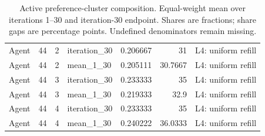 \begin{table}[htbp!]
\begin{tabular}{lrrlrrl}
Agent & 44 & 2 & iteration\_30 & 0.206667 & 31 & L4: uniform refill \\
Agent & 44 & 2 & mean\_1\_30 & 0.205111 & 30.7667 & L4: uniform refill \\
Agent & 44 & 3 & iteration\_30 & 0.233333 & 35 & L4: uniform refill \\
Agent & 44 & 3 & mean\_1\_30 & 0.219333 & 32.9 & L4: uniform refill \\
Agent & 44 & 4 & iteration\_30 & 0.233333 & 35 & L4: uniform refill \\
Agent & 44 & 4 & mean\_1\_30 & 0.240222 & 36.0333 & L4: uniform refill \\
\hline
\end{tabular}
\caption{Active preference-cluster composition. Equal-weight mean over iterations 1--30 and iteration-30 endpoint. Shares are fractions; share gaps are percentage points. Undefined denominators remain missing.}
\label{chap:results:tab:rq1_sampling_cluster_composition}
\end{table}
